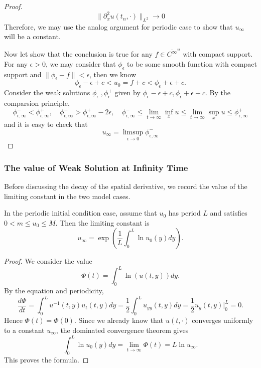 \begin{proof}
    \[\lVert \partial^2_x u(t_n,\cdot)\rVert_{L^2} \to 0\]
    Therefore, we may use the analog argument for periodic case to show that $u_{\infty}$ will be a constant.\par
    Now let show that the conclusion is true for any $f\in \overline{C^{\infty}}^u$ with compact support. For any $\epsilon > 0$, we may consider that $\phi_{\epsilon}$ to be some smooth function with compact support and $\lVert \phi_{\epsilon} - f\rVert <\epsilon$, then we know
    \[
    \phi_{\epsilon} - \epsilon +c < u_0 = f +c < \phi_{\epsilon} + \epsilon +c.
    \]
    Consider the weak solutions $\phi^-_{\epsilon},\phi^+_{\epsilon}$ given by $\phi_{\epsilon} - \epsilon +c, \phi_{\epsilon} + \epsilon +c$. By the comparsion principle,
    \[\phi^-_{\epsilon,\infty} < \phi^+_{\epsilon,\infty},\quad \phi^-_{\epsilon,\infty} > \phi^+_{\epsilon,\infty} - 2\epsilon,\quad\phi^-_{\epsilon,\infty} \leq \lim_{t\to \infty}\inf_x u \leq\lim_{t\to \infty}\sup_x u \leq \phi^+_{\epsilon,\infty} \]
    and it is easy to check that
    \[
    u_{\infty} = \limsup_{\epsilon \to 0} \phi^{-}_{\epsilon,\infty}
    \]
\end{proof}


\subsubsection{The value of Weak Solution at Infinity Time}

Before discussing the decay of the spatial derivative, we record the value of the limiting constant in the two model cases.

\begin{theorem}
    In the periodic initial condition case, assume that $u_0$ has period $L$ and satisfies $0<m\leq u_0\leq M$. Then the limiting constant is
    \[
    u_{\infty} = \exp\left(\dfrac{1}{L}\int^L_0 \ln u_0(y)dy\right).
    \]
\end{theorem}
\begin{proof}
    We consider the value
    \[
    \Phi(t) = \int_0^L \ln(u(t,y))dy.
    \]
    By the equation and periodicity,
    \[
    \dfrac{d\Phi}{dt}
    = \int_0^L u^{-1}(t,y)u_t(t,y)dy
    = \dfrac{1}{2}\int_0^L u_{yy}(t,y)dy
    = \dfrac12 u_y(t,y)\big|_0^L=0.
    \]
    Hence $\Phi(t)=\Phi(0)$. Since we already know that $u(t,\cdot)$ converges uniformly to a constant $u_{\infty}$, the dominated convergence theorem gives
    \[
    \int_0^L \ln u_0(y)dy
    =\lim_{t\to\infty}\Phi(t)
    =L\ln u_{\infty}.
    \]
    This proves the formula.
\end{proof}

